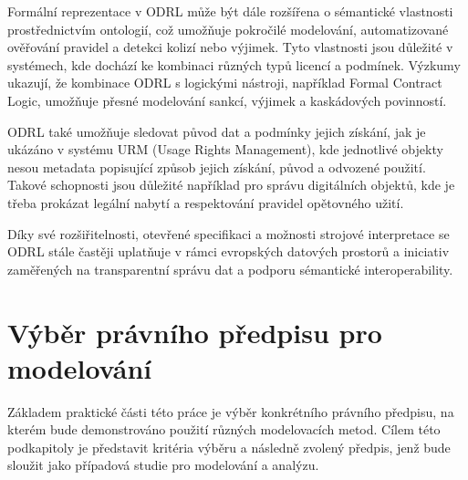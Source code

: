 Formální reprezentace v ODRL může být dále rozšířena o sémantické vlastnosti prostřednictvím ontologií, což umožňuje pokročilé modelování, automatizované ověřování pravidel a detekci kolizí nebo výjimek. Tyto vlastnosti jsou důležité v systémech, kde dochází ke kombinaci různých typů licencí a podmínek. Výzkumy ukazují, že kombinace ODRL s logickými nástroji, například Formal Contract Logic, umožňuje přesné modelování sankcí, výjimek a kaskádových povinností. \cite{Governatori2010}

ODRL také umožňuje sledovat původ dat a podmínky jejich získání, jak je ukázáno v systému URM (Usage Rights Management), kde jednotlivé objekty nesou metadata popisující způsob jejich získání, původ a odvozené použití. Takové schopnosti jsou důležité například pro správu digitálních objektů, kde je třeba prokázat legální nabytí a respektování pravidel opětovného užití. \cite{Bassiliades2015,Governatori2010}

Díky své rozšiřitelnosti, otevřené specifikaci a možnosti strojové interpretace se ODRL stále častěji uplatňuje v rámci evropských datových prostorů a iniciativ zaměřených na transparentní správu dat a podporu sémantické interoperability. \cite{Kasten,Governatori2010}



\section{Výběr právního předpisu pro modelování}
\label{sec:vyber-právního-predpisu}
Základem praktické části této práce je výběr konkrétního právního předpisu, na kterém bude demonstrováno použití různých modelovacích metod. Cílem této podkapitoly je představit kritéria výběru a následně zvolený předpis, jenž bude sloužit jako případová studie pro modelování a analýzu.


